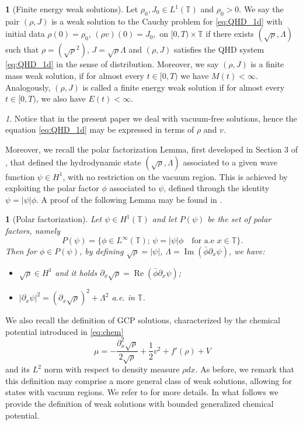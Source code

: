 \documentclass[leqno]{amsart}
\theoremstyle{plain}
\theoremstyle{definition}
\newtheorem{defn}[thm]{\protect\definitionname}
\theoremstyle{remark}
\newtheorem{rem}[thm]{\protect\remarkname}
\theoremstyle{plain}
\newtheorem{lem}[thm]{\protect\lemmaname}
\theoremstyle{plain}
\providecommand{\definitionname}{Definition}
\providecommand{\lemmaname}{Lemma}
\providecommand{\remarkname}{Remark}
\def\T{{\mathbb T}}%
\def\d{{\partial}}
\DeclareMathOperator{\RE}{Re}
\DeclareMathOperator{\IM}{Im}
\numberwithin{equation}{section}
\begin{document}
 
\begin{defn}[Finite energy weak solutions]\label{def:FEWS}
Let $\rho_0, J_0\in L^1(\T)$ and $\rho_0>0$. We say the pair $(\rho, J)$ is a weak solution to the Cauchy problem for \eqref{eq:QHD_1d} with initial data
$
\rho(0)=\rho_0$, $(\rho v)(0)=J_0,
$
on $[0, T)\times\T$ if there exists $(\sqrt{\rho}, \Lambda)$ such that $\rho=(\sqrt{\rho}^2)$, $J=\sqrt{\rho}\Lambda$ and $(\rho, J)$ satisfies the QHD system \eqref{eq:QHD_1d} in the sense of distribution.
Moreover, we say $(\rho,J)$ is a finite mass weak solution, if for almost every $t\in[0, T)$ we have $M(t)<\infty$. Analogously, $(\rho,J)$ is called a finite energy weak solution if for almost every $t\in[0, T)$, we also have $E(t)<\infty$. 
\end{defn}
\begin{rem}
Notice that in the present paper we deal with vacuum-free solutions, hence the equation \eqref{eq:QHD_1d} may be expressed in terms of $\rho$ and $v$.
\end{rem}
Moreover, we recall the polar factorization Lemma, first developed in Section 3 of \cite{AM1,AM2}, that defined the hydrodynamic state $(\sqrt{\rho}, \Lambda)$ associated to a given wave function $\psi\in H^1$, with no restriction on the vacuum region. This is achieved by exploiting the polar factor $\phi$ associated to $\psi$, defined through the identity $\psi=|\psi|\phi$. A proof of the following Lemma may be found in \cite[Proposition 1.2]{AM_b}.
\begin{lem}[Polar factorization]\label{lem:polar}
Let $\psi\in H^1(\T)$ and let $P(\psi)$ be the  set of polar factors, namely
\[
P(\psi)=\{\phi\in L^\infty(\T);\,\psi=|\psi|\phi\quad\textrm{for a.e }x\in\T\}.
\]
Then for $\phi\in P(\psi)$, by defining $\sqrt{\rho}=|\psi|$, $\Lambda=\IM(\bar\phi\d_x\psi)$, we have:
\begin{itemize}
\item $\sqrt{\rho}\in H^1$ and it holds 
$\d_x\sqrt{\rho}=\RE(\bar\phi\d_x\psi)$;
\item 
$|\d_x\psi|^2=
(\d_x\sqrt{\rho})^2+\Lambda^2$ a.e. in $\T$.
\end{itemize}
\end{lem}

We also recall the definition of GCP solutions, characterized by the chemical potential introduced in \eqref{eq:chem}
\[
\mu=-\frac{\d_x^2\sqrt\rho}{2\sqrt\rho}+\frac12v^2+f'(\rho)+V
\]
and its $L^2$ norm with respect to density measure $\rho dx$.
As before, we remark that this definition may comprise a more general class of weak solutions, allowing for states with vacuum regions. We refer to \cite{AMZ1} for more details.
In what follows we provide the definition of weak solutions with bounded generalized chemical potential.
\end{document}
